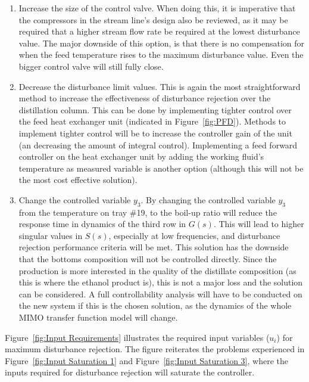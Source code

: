\begin{enumerate}
	\item Increase the size of the control valve. When doing this, it is imperative that the compressors in the stream line's design also be reviewed, as it may be required that a higher stream flow rate be required at the lowest disturbance value. The major downside of this option, is that there is no compensation for when the feed temperature rises to the maximum disturbance value. Even the bigger control valve will still fully close.
	\item Decrease the disturbance limit values. This is again the most straightforward method to increase the effectiveness of disturbance rejection over the distillation column. This can be done by implementing tighter control over the feed heat exchanger unit (indicated in Figure~\ref{fig:PFD}). Methods to implement tighter control will be to increase the controller gain of the unit (an decreasing the amount of integral control). Implementing a feed forward controller on the heat exchanger unit by adding the working fluid's temperature as measured variable is another option (although this will not be the most cost effective solution).
	\item Change the controlled variable $y_3$. By changing the controlled variable $y_3$ from the temperature on tray \#19, to the boil-up ratio will reduce the response time in dynamics of the third row in $G(s)$. This will lead to higher singular values in $S(s)$, especially at low frequencies, and disturbance rejection performance criteria will be met. This solution has the downside that the bottoms composition will not be controlled directly. Since the production is more interested in the quality of the distillate composition (as this is where the ethanol product is), this is not a major loss and the solution can be considered. A full controllability analysis will have to be conducted on the new system if this is the chosen solution, as the dynamics of the whole MIMO transfer function model will change.
\end{enumerate}

Figure~\ref{fig:Input Requirements} illustrates the required input variables ($u_i$) for maximum disturbance rejection. The figure reiterates the problems experienced in Figure~\ref{fig:Input Saturation 1} and Figure~\ref{fig:Input Saturation 3}, where the inputs required for disturbance rejection will saturate the controller.  

